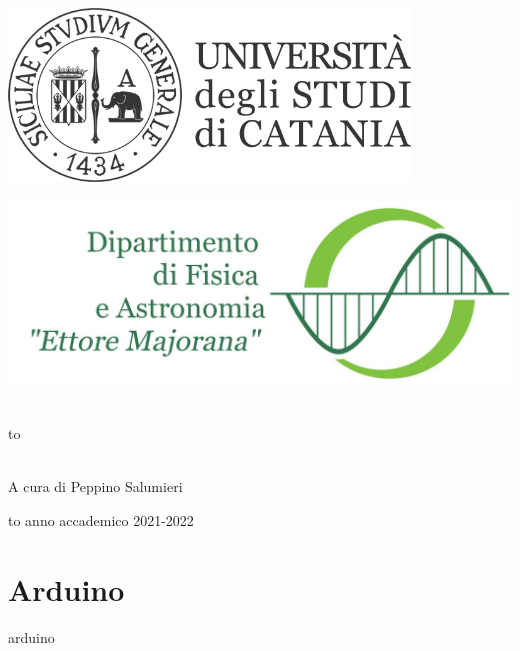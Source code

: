 \documentclass[openany,12pt]{book}
\newcommand\blankpage{%
    \null
    \thispagestyle{empty}%
    \newpage} %
\begin{document}
\thispagestyle{empty}
\begin{center}

\begin{minipage}[c]{0.45\textwidth}
\begin{flushleft}
\includegraphics[width=0.8\textwidth]{logo-unict-orizzontale-grigio.png}
\end{flushleft}
\end{minipage}
\hfill
\begin{minipage}[c]{0.45\textwidth}
\begin{flushright}
\includegraphics[width=\textwidth]{logo_dfa_orizzontale}
\end{flushright}
\end{minipage}\\
\medskip
\hbox to \textwidth{\hrulefill}

\vfill
\vfill


\uppercase{}\\

\vfill
\large{A cura di Peppino Salumieri}

\vfill
\vfill
\hbox to \textwidth{\hrulefill}
{\sc anno accademico 2021-2022}
\end{center}

\afterpage{\blankpage}
\newpage

\tableofcontents

\newpage

\chapter{Arduino}
{arduino}
\end{document}
